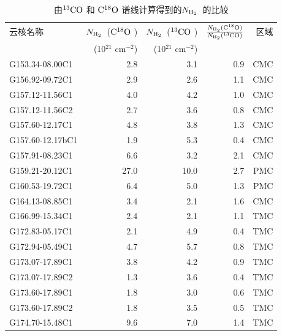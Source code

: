 \documentclass[UTF8, nocolorlinks]{pkuthss}
\newcommand{\cob}{$\rm ^{13}CO$ }
\newcommand{\coc}{$\rm C^{18}O$ }
\newcommand{\nhyd}{$N_{\rm H_2}$\ }
\begin{document}
			\begin{table}
				\begin{center}
				\begin{footnotesize}
				\setlength{\tabcolsep}{0.05cm}
				\caption{由\cob 和 \coc 谱线计算得到的\nhyd 的比较\label{Tab.13/18}}
				\begin{tabular}{lrrrr}
				\toprule
				\hline
				云核名称         &\nhyd(\coc)&\nhyd(\cob)& $\frac{N_{\rm H_2}(\rm C^{18}O)}{N_{\rm H_2}(\rm ^{13}CO)}$  &区域\\
				              &(10$^{21}$ cm$^{-2}$)&(10$^{21}$ cm$^{-2}$)& &\\
				
				\hline
				G153.34-08.00C1  &   2.8	 &  3.1	&0.9   &  CMC \\
				G156.92-09.72C1  &   2.9	 &  2.6	&1.1   &  CMC \\
				G157.12-11.56C1  &   4.0	 &  4.2	&1.0   &  CMC \\
				G157.12-11.56C2  &   2.7	 &  3.6	&0.8   &  CMC \\
				G157.60-12.17C1  &   4.8	 &  3.8	&1.3   &  CMC \\
				G157.60-12.17bC1 &   1.9	 &  5.3	&0.4   &  CMC \\
				G157.91-08.23C1  &   6.6	 &  3.2	&2.1   &  CMC \\
				G159.21-20.12C1  &  27.0     & 10.0	&2.7   &  PMC \\
				G160.53-19.72C1  &   6.4	 &  5.0	&1.3   &  PMC \\
				G164.13-08.85C1  &   3.4	 &  2.1	&1.6   &  CMC \\
				G166.99-15.34C1  &   2.4	 &  2.1	&1.1   &  TMC \\
				G172.83-05.17C1  &   2.1	 &  4.9	&0.4   &  TMC \\
				G172.94-05.49C1  &   4.7	 &  5.7	&0.8   &  TMC \\
				G173.07-17.89C1  &   3.8	 &  4.2	&0.9   &  TMC \\
				G173.07-17.89C2  &   1.3	 &  3.6	&0.4   &  TMC \\
				G173.60-17.89C1  &   1.8	 &  3.0	&0.6   &  TMC \\
				G173.60-17.89C2  &   1.8	 &  3.5	&0.5   &  TMC \\
				G174.70-15.48C1  &   9.6	 &  7.0	&1.4   &  TMC \\
				\hline
				\bottomrule
				\end{tabular}
				\end{footnotesize}
				\end{center}
			\end{table}
\end{document}
